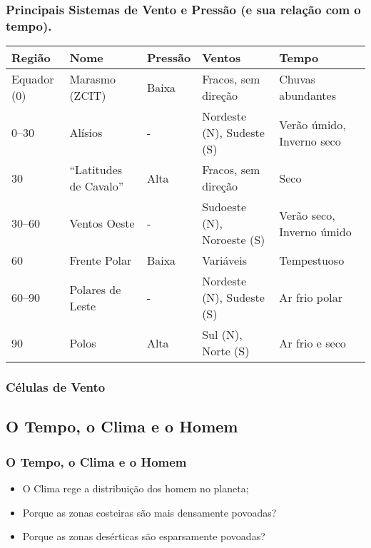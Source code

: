\begin{frame}
\frametitle{Principais Sistemas de Vento e Pressão (e sua relação com o tempo).}
{\tiny
\begin{table}
    \begin{tabular}{lllll}
    Região                           & Nome                     & Pressão & Ventos                     & Tempo                     \\
        \hline
    Equador (0\textdegree{})         & Marasmo (ZCIT)           & Baixa   & Fracos, sem direção        & Chuvas abundantes         \\
    0\textdegree{}--30\textdegree{}  & Alísios                  & -       & Nordeste (N), Sudeste (S)  & Verão úmido, Inverno seco \\
    30\textdegree{}                  & ``Latitudes de Cavalo''  & Alta    & Fracos, sem direção        & Seco                      \\
    30\textdegree{}--60\textdegree{} & Ventos Oeste             & -       & Sudoeste (N), Noroeste (S) & Verão seco, Inverno úmido \\
    60\textdegree{}                  & Frente Polar             & Baixa   & Variáveis                  & Tempestuoso               \\
    60\textdegree{}--90\textdegree{} & Polares de Leste         & -       & Nordeste (N), Sudeste (S)  & Ar frio polar             \\
    90\textdegree{}                  & Polos                    & Alta    & Sul (N), Norte (S)         & Ar frio e seco            \\
    \hline
    \end{tabular}
\end{table}
}
\end{frame}


\begin{frame}
\frametitle{Células de Vento}
  \begin{center}
  \end{center}
\end{frame}


\subsection{O Tempo, o Clima e o Homem}
\begin{frame}
\frametitle{O Tempo, o Clima e o Homem}
  \begin{itemize}[<+-| alert@+>]
    \item O Clima rege a distribuição dos homem no planeta;
    \item Porque as zonas costeiras são mais densamente povoadas?
    \item Porque as zonas desérticas são esparsamente povoadas?
\end{itemize}
\end{frame}



